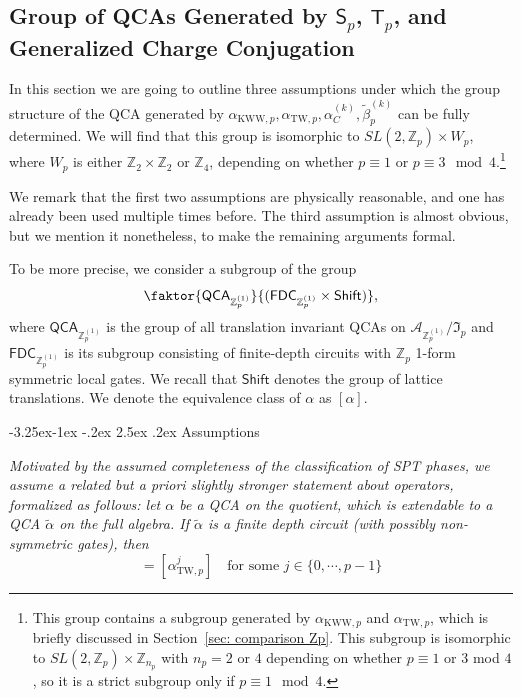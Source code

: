 \documentclass[aps,twocolumn,prx,floatfix,preprintnumbers, nofootinbib,10pt]{revtex4-2}
\makeatletter
\numberwithin{equation}{section}
\theoremstyle{definition}
\theoremstyle{remark}
\theoremstyle{claim}
\newcommand{\be}{\begin{equation}}
\newcommand{\ee}{\end{equation}}
\newcommand{\aKWWp}{\alpha_{\text{KWW},p}}
\newcommand{\aTWp}{\alpha_{\text{TW},p}}
\newcommand{\Z}{{\mathbb Z}}
\renewcommand\subsubsection{\@startsection{subsubsection}{3}{\z@}%
                                     {-3.25ex\@plus -1ex \@minus -.2ex}%
                                     {2.5ex \@plus .2ex}%
                                     {\centering\itshape\bfseries\small}}
\makeatother
\begin{document}
\subsection{Group of QCAs Generated by $\mathsf{S}_p$, $\mathsf{T}_p$, and Generalized Charge Conjugation}
\label{sec:ZpQCAgroup}


In this section we are going to outline three assumptions under which the group structure of the QCA generated by $\aKWWp, \aTWp, \alpha_C^{(k)}, \tilde{\beta}_p^{(k)}$ can be fully determined. We will find that this group is isomorphic to $SL(2, \Z_p) \times W_p$, where $W_p$ is either $\Z_2 \times \Z_2$ or $\Z_4$, depending on whether $p \equiv 1$ or $p \equiv 3 \mod 4$.\footnote{This group contains a subgroup generated by $\aKWWp$ and $\aTWp$, which is briefly discussed in Section~\ref{sec: comparison Zp}. This subgroup is isomorphic to $SL(2, \mathbb{Z}_p) \times \mathbb{Z}_{n_p}$ with $n_p = 2$ or $4$ depending on whether $p \equiv 1$ or $3$ mod $4$, so it is a strict subgroup only if $p \equiv 1 \mod 4$.}

We remark that the first two assumptions are physically reasonable, and one has already been used multiple times before. The third assumption is almost obvious, but we mention it nonetheless, to make the remaining arguments formal. 


To be more precise, we consider a subgroup of the group
\begin{equation}\label{eq:translation_inv_qca_group}
\faktor{\mathsf{QCA}_{\mathbb{Z}_p^{(1)}}}{(\mathsf{FDC}_{\mathbb{Z}_p^{(1)}} \times \mathsf{Shift})},
\end{equation}
where $\mathsf{QCA}_{\mathbb{Z}_p^{(1)}}$ is the group of all translation invariant QCAs on $\mathcal{A}_{\mathbb{Z}_p^{(1)}} / \mathfrak{I}_p$ and $\mathsf{FDC}_{\mathbb{Z}_p^{(1)}}$ is its subgroup consisting of finite-depth circuits with $\mathbb{Z}_p$ 1-form symmetric local gates.
We recall that $\mathsf{Shift}$ denotes the group of lattice translations.
We denote the equivalence class of $\alpha$ as $[\alpha]$.

\subsubsection{Assumptions}




 \textit{{Motivated by the assumed completeness of the classification of SPT phases, we assume a related but a priori slightly stronger statement about operators, formalized as follows}: let $\alpha$ be a QCA on the quotient, which is extendable to a QCA $\tilde{\alpha}$ on the full algebra. If $\tilde{\alpha}$ is a finite depth circuit (with possibly non-symmetric gates), then
\be
[\alpha] = [\alpha_{\text{TW}, p}^j] \quad \text{for some } j \in \{0, \cdots, p - 1 \}
\ee}
\end{document}
